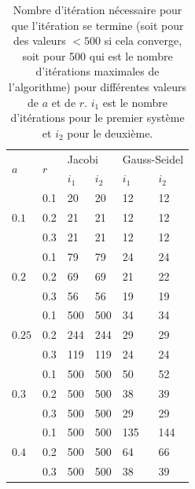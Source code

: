 \begin{table}
  \centering
  \begin{tabular}{|l|l|l|l|l|l|}
    \hline
    \multirow{2}{*}{$a$} & \multirow{2}{*}{$r$} & \multicolumn{2}{l|}{Jacobi} & \multicolumn{2}{l|}{Gauss-Seidel}\\
    \cline{3-6}
      &  & $i_1$ & $i_2$ & $i_1$ & $i_2$\\
    \hline
    \multirow{3}{*}{$0.1$} & 0.1 & 20 & 20 & 12 & 12 \\
    \cline{2-6}
      & 0.2 & 21 & 21 & 12 & 12 \\
      \cline{2-6}
      & 0.3 & 21 & 21 & 12 & 12 \\
    \hline
    \multirow{3}{*}{$0.2$} & 0.1 & 79 & 79 & 24 & 24 \\
    \cline{2-6}
      & 0.2 & 69 & 69 & 21 & 22 \\
      \cline{2-6}
      & 0.3 & 56 & 56 & 19 & 19 \\
    \hline
    \multirow{3}{*}{$0.25$} & 0.1 & 500 & 500 & 34 & 34 \\
    \cline{2-6}
      & 0.2 & 244 & 244 & 29 & 29 \\
      \cline{2-6}
      & 0.3 & 119 & 119 & 24 & 24\\
    \hline
    \multirow{3}{*}{$0.3$} & 0.1 & 500 & 500 & 50 & 52 \\
    \cline{2-6}
      & 0.2 & 500 & 500 & 38 & 39 \\
      \cline{2-6}
      & 0.3 & 500 & 500 & 29 & 29 \\
      \hline
      \multirow{3}{*}{$0.4$} & 0.1 & 500 & 500 & 135 & 144 \\
    \cline{2-6}
      & 0.2 & 500 & 500 & 64 & 66 \\
      \cline{2-6}
      & 0.3 & 500 & 500 & 38 & 39 \\
      \hline
  \end{tabular}
  \caption{Nombre d'itération nécessaire pour que l'itération se termine (soit pour des valeurs $<500$ si cela converge, soit pour 500 qui est le nombre d'itérations maximales de l'algorithme) pour différentes valeurs de $a$ et de $r$.
  $i_1$ est le nombre d'itérations pour le premier système et $i_2$ pour le deuxième.}
  \label{tab:iterQ3JvsGS}
\end{table}


